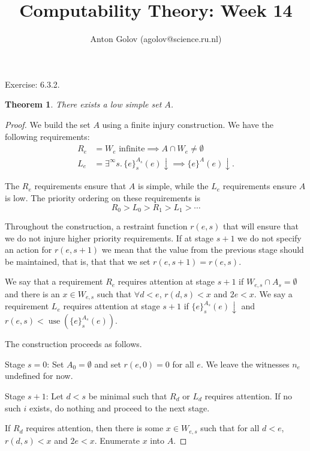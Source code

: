\documentclass{article}
\title{Computability Theory: Week 14}
\author{Anton Golov (agolov@science.ru.nl)}
\newtheorem{theorem}{Theorem}
\newcommand{\set}[1]{\{ #1 \}}
\newcommand{\terminates}{\!\!\downarrow}
\DeclareMathOperator{\use}{use}
\begin{document}
  \maketitle

  Exercise: 6.3.2.

  \begin{theorem}
    There exists a low simple set $A$.
  \end{theorem}

  \begin{proof}
    We build the set $A$ using a finite injury construction.  We have the following requirements:
    \begin{align*}
      R_e &= \text{$W_e$ infinite} \implies A \cap W_e \neq \emptyset\\
      L_e &= \exists^\infty s.\, \set{e}^{A_s}_s(e)\terminates \implies \set{e}^A(e)\terminates.
    \end{align*}

    The $R_e$ requirements ensure that $A$ is simple, while the $L_e$ requirements ensure $A$ is low.  The priority
    ordering on these requirements is
    \[
      R_0 > L_0 > R_1 > L_1 > \cdots
    \]

    Throughout the construction, a restraint function $r(e, s)$ that will ensure that we do not injure higher priority
    requirements.  If at stage $s+1$ we do not specify an action for $r(e, s+1)$ we mean that the value from the
    previous stage should be maintained, that is, that that we set $r(e, s+1) = r(e,s)$.

    We say that a requirement $R_e$ requires attention at stage $s+1$ if $W_{e,s} \cap A_s = \emptyset$ and there is an
    $x \in W_{e,s}$ such that $\forall d < e$, $r(d, s) < x$ and $2e < x$.  We say a requirement $L_e$ requires
    attention at stage $s+1$ if $\set{e}^{A_s}_s(e)\terminates$ and $r(e, s) < \use(\set{e}^{A_s}_s(e))$.

    The construction proceeds as follows.

    Stage $s = 0$: Set $A_0 = \emptyset$ and set $r(e, 0) = 0$ for all $e$.  We leave the witnesses $n_e$ undefined for
    now.

    Stage $s+1$: Let $d < s$ be minimal such that $R_d$ or $L_d$ requires attention.  If no such $i$ exists, do nothing
    and proceed to the next stage.

    If $R_d$ requires attention, then there is some $x \in W_{e,s}$ such that for all $d < e$, $r(d, s) < x$ and $2e <
    x$.  Enumerate $x$ into $A$.


\end{proof}
\end{document}
